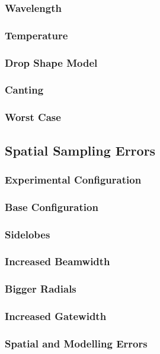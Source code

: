 \documentclass[red]{beamer}
\begin{document}
\begin{frame}
	\frametitle{Wavelength}
\end{frame}

\begin{frame}
	\frametitle{Temperature}
\end{frame}

\begin{frame}
	\frametitle{Drop Shape Model}
\end{frame}

\begin{frame}
	\frametitle{Canting}
\end{frame}

\begin{frame}
	\frametitle{Worst Case}
\end{frame}

\subsection{Spatial Sampling Errors}
\begin{frame}
	\frametitle{Experimental Configuration}
\end{frame}

\begin{frame}
	\frametitle{Base Configuration}
\end{frame}

\begin{frame}
	\frametitle{Sidelobes}
\end{frame}

\begin{frame}
	\frametitle{Increased Beamwidth}
\end{frame}

\begin{frame}
	\frametitle{Bigger Radials}
\end{frame}

\begin{frame}
	\frametitle{Increased Gatewidth}
\end{frame}

\begin{frame}
	\frametitle{Spatial and Modelling Errors}
\end{frame}

\end{document}
